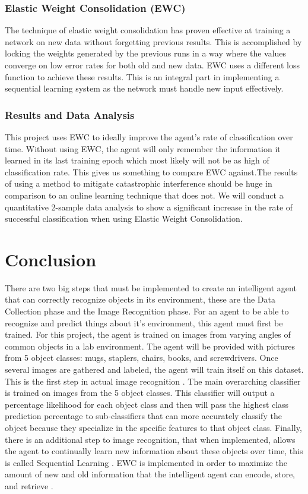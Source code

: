 \documentclass[draftclsnofoot, onecolumn, 10pt, compsoc]{IEEEtran}
\begin{document}
			\subsubsection{Elastic Weight Consolidation (EWC)}
				The technique of elastic weight consolidation has proven effective at training a network on new data without forgetting previous results. This is accomplished by locking the weights generated by the previous runs in a way where the values converge on low error rates for both old and new data. EWC uses a different loss function to achieve these results. This is an integral part in implementing a sequential learning system as the network must handle new input effectively.  
			
			\subsubsection{Results and Data Analysis}
				This project uses EWC to ideally improve the agent's rate of classification over time. Without using EWC, the agent will only remember the information it learned in its last training epoch which most likely will not be as high of classification rate. This gives us something to compare EWC against.The results of using a method to mitigate catastrophic interference should be huge in comparison to an online learning technique that does not. We will conduct a quantitative 2-sample data analysis to show a significant increase in the rate of successful classification when using Elastic Weight Consolidation. 
	
	\section{Conclusion}
		There are two big steps that must be implemented to create an intelligent agent that can correctly recognize objects in its environment, these are the Data Collection phase and the Image Recognition phase. For an agent to be able to recognize and predict things about it's environment, this agent must first be trained. For this project, the agent is trained on images from varying angles of common objects in a lab environment. The agent will be provided with pictures from 5 object classes: mugs, staplers, chairs, books, and screwdrivers. Once several images are gathered and labeled, the agent will train itself on this dataset. This is the first step in actual image recognition \cite{ImgRecog}. The main overarching classifier is trained on images from the 5 object classes. This classifier will output a percentage likelihood for each object class and then will pass the highest class prediction percentage to sub-classifiers that can more accurately classify the object because they specialize in the specific features to that object class. Finally, there is an additional step to image recognition, that when implemented, allows the agent to continually learn new information about these objects over time, this is called Sequential Learning \cite{Kirkpatrick}. EWC is implemented in order to maximize the amount of new and old information that the intelligent agent can encode, store, and retrieve \cite{McDermott}.
		
\end{document}

